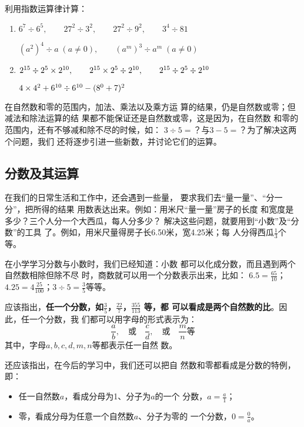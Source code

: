 \begin{ex}
	利用指数运算律计算：
	\begin{enumerate}
		\item $6^7\div 6^5,\qquad 27^2\div 3^2,\qquad 27^2\div 9^2,\qquad 3^4\div 81$
		
		$(a^2)^4\div a\; (a\ne 0),\qquad (a^m)^3\div a^m\; (a\ne 0)$
		\item $2^{15}\div 2^5\times 2^{10},\qquad 2^{15}\times 2^5\div 2^{10},\qquad 2^{15}\div 2^5\div 2^{10}$
		
		$4\times 4^2 +6^{10}\div 6^{10}-(8^0+7)^2$
	\end{enumerate}
\end{ex}

在自然数和零的范围内，加法、乘法以及乘方运
算的结果，仍是自然数或零；但减法和除法运算的结
果都不能保证还是自然数或零，这是因为，在自然数
和零的范围内，还有不够减和除不尽的时候，如：
$3\div 5=$？与$3-5=$？为了解决这两个问题，我们
还将逐步引进一些新数，并讨论它们的运算。

\subsection{分数及其运算}

在我们的日常生活和工作中，还会遇到一些量，
要求我们去“量一量”、“分一分”，把所得的结果
用数表达出来。例如：用米尺“量一量”房子的长度
和宽度是多少？三个人分一个大西瓜，每人分多少？
解决这些问题，就要用到“小数”及“分数”的工具
了。例如，用米尺量得房子长6.50米，宽4.25米；每
人分得西瓜$\frac{1}{3}$个等。

在小学学习分数与小数时，我们已经知道：小数
都可以化成分数，而且遇到两个自然数相除但除不尽
时，商数就可以用一个分数表示出来，比如：
$6.5=\frac{65}{10}$；$4.25=4\frac{25}{100}$；$3\div 5=\frac{3}{5}$等等。

应该指出，\textbf{任一个分数，如$\frac{3}{5}$，$\frac{22}{7}$，$\frac{355}{113}$
	等，都
	可以看成是两个自然数的比}。因此，任一个分数，我
们都可以用字母的形式表示为：
\[\frac{a}{b},\quad \text{或}\quad \frac{c}{d}, \quad \text{或} \quad \frac{m}{n} \text{等} \]
其中，字母$a, b, c, d, m,n$等都表示任一自然
数。

还应该指出，在今后的学习中，我们还可以把自
然数和零都看成是分数的特例，即：
\begin{itemize}
	\item 任一自然数$a$，看成分母为1、分子为$a$的一个
	分数，$a=\frac{a}{1}$；
	\item 零，看成分母为任意一个自然数$a$、分子为零的
	一个分数，$0=\frac{0}{a}$。
\end{itemize}

